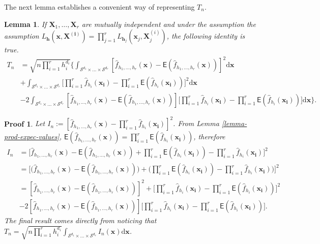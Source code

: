 \documentclass{article}
\newtheorem{lemma}{Lemma}[section]
\newtheorem{Proof}{Proof}[section]
\begin{document}
The next lemma establishes a convenient way of representing $T_n$.
\begin{lemma}
    If $\mathbf{X}_1, \dots, \mathbf{X}_r$ are mutually independent and under the assumption the assumption $L_{\mathbf{h}}(\mathbf{x},\mathbf{X^{(i)}}) = \prod_{j=1}^{r} L_{\mathbf{h}_j}(\mathbf{x}_j,\mathbf{X}_j^{(i)})$, the following identity is true.
    \begin{align}
       T_n &= \sqrt{n \prod_{i = 1}^{r} h_i^{d_i}} \Bigg\{ \int_{\mathcal{S}^{d_1} \times \dots \times \mathcal{S}^{d_r}} [\hat{f}_{h_1, \dots, h_r}(\mathbf{x}) - \mathsf{E} (\hat{f}_{h_1, \dots, h_r}(\mathbf{x}))]^2 \mathrm{d} \mathbf{x} \\
    &+ \int_{\mathcal{S}^{d_1} \times \dots \times \mathcal{S}^{d_r}} \Big[ \prod_{i = 1}^{r} \hat{f}_{h_i}(\mathbf{x_i}) - \prod_{i = 1}^{r} \mathsf{E} (\hat{f}_{h_i} (\mathbf{x_i})) \Big]^2 \mathrm{d} \mathbf{x} \\
    &-2 \int_{\mathcal{S}^{d_1} \times \dots \times \mathcal{S}^{d_r}} [\hat{f}_{h_1, \dots, h_r}(\mathbf{x}) - \mathsf{E} (\hat{f}_{h_1, \dots, h_r}(\mathbf{x}))] \Big[ \prod_{i = 1}^{r} \hat{f}_{h_i}(\mathbf{x_i}) - \prod_{i = 1}^{r} \mathsf{E} (\hat{f}_{h_i} (\mathbf{x_i})) \Big] \mathrm{d} \mathbf{x} \Bigg\}.
    \end{align}
\end{lemma}
\begin{Proof}
    Let $I_n := [\hat{f}_{h_1, \dots, h_r}(\mathbf{x}) - \prod_{i = 1}^{r} \hat{f}_{h_i}(\mathbf{x_i})]^2$. From Lemma \ref{lemma-prod-expec-values}, $\mathsf{E} (\hat{f}_{h_1, \dots, h_r}(\mathbf{x})) = \prod_{i = 1}^{r} \mathsf{E} (\hat{f}_{h_i}(\mathbf{x_i}))$, therefore
    \begin{align}
        I_n &= \Bigg[\hat{f}_{h_1, \dots, h_r}(\mathbf{x}) - \mathsf{E} (\hat{f}_{h_1, \dots, h_r}(\mathbf{x})) + \prod_{i = 1}^{r} \mathsf{E} (\hat{f}_{h_i}(\mathbf{x_i})) - \prod_{i = 1}^{r} \hat{f}_{h_i}(\mathbf{x_i}) \Bigg]^2 \\
        &= \Bigg[ \Bigg( \hat{f}_{h_1, \dots, h_r}(\mathbf{x}) - \mathsf{E} (\hat{f}_{h_1, \dots, h_r}(\mathbf{x})) \Bigg) + \Bigg( \prod_{i = 1}^{r} \mathsf{E} (\hat{f}_{h_i}(\mathbf{x_i})) - \prod_{i = 1}^{r} \hat{f}_{h_i}(\mathbf{x_i}) \Bigg) \Bigg]^2 \\
        &= [\hat{f}_{h_1, \dots, h_r}(\mathbf{x}) - \mathsf{E} (\hat{f}_{h_1, \dots, h_r}(\mathbf{x}))]^2 + \Big[ \prod_{i = 1}^{r} \hat{f}_{h_i}(\mathbf{x_i}) - \prod_{i = 1}^{r} \mathsf{E} (\hat{f}_{h_i} (\mathbf{x_i})) \Big]^2 \\
        &- 2[\hat{f}_{h_1, \dots, h_r}(\mathbf{x}) - \mathsf{E} (\hat{f}_{h_1, \dots, h_r}(\mathbf{x}))] \Big[ \prod_{i = 1}^{r} \hat{f}_{h_i}(\mathbf{x_i}) - \prod_{i = 1}^{r} \mathsf{E} (\hat{f}_{h_i} (\mathbf{x_i})) \Big].
    \end{align}
    The final result comes directly from noticing that $T_n = \sqrt{n \prod_{i = 1}^{r} h_i^{d_i}} \int_{\mathcal{S}^{d_1} \times \dots \times \mathcal{S}^{d_r}}I_n(\mathbf{x}) \mathrm{d} \mathbf{x}$.
\end{Proof}
\end{document}
